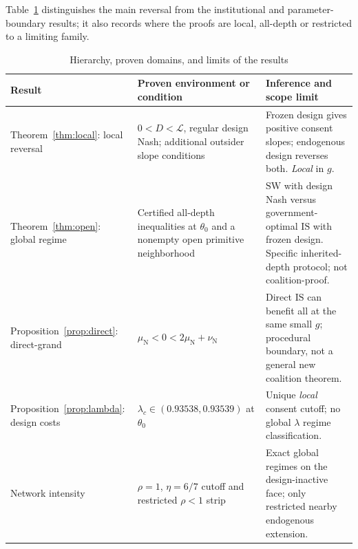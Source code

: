 \documentclass[11pt,a4paper]{article}
\theoremstyle{remark}\newtheorem{remark}[theorem]{Remark}
\newcommand{\SW}{\mathrm{SW}}\newcommand{\SU}{\mathrm{SU}}\newcommand{\IS}{\mathrm{IS}}
\newcommand{\N}{\mathrm{N}}\newcommand{\F}{\mathrm{F}}
\begin{document}
Table~\ref{tab:map} distinguishes the main reversal from the institutional and parameter-boundary results; it also records where the proofs are local, all-depth or restricted to a limiting family.


\begin{table}[H]
\centering\footnotesize
\caption{Hierarchy, proven domains, and limits of the results}\label{tab:map}
\renewcommand{\arraystretch}{1.22}
\begin{tabularx}{\linewidth}{@{}>{\raggedright\arraybackslash}p{.18\linewidth}>{\raggedright\arraybackslash}p{.34\linewidth}>{\raggedright\arraybackslash}X@{}}
\toprule
Result & Proven environment or condition & Inference and scope limit \\
\midrule
Theorem~\ref{thm:local}: local reversal & $0<D<\mathcal L$, regular design Nash; additional outsider slope conditions & Frozen design gives positive consent slopes; endogenous design reverses both. \emph{Local} in $g$. \\
Theorem~\ref{thm:open}: global regime & Certified all-depth inequalities at $\theta_0$ and a nonempty open primitive neighborhood & $\SW$ with design Nash versus government-optimal $\IS$ with frozen design. Specific inherited-depth protocol; not coalition-proof. \\
Proposition~\ref{prop:direct}: direct-grand & $\mu_{\N}<0<2\mu_{\N}+\nu_{\N}$ & Direct $\IS$ can benefit all at the same small $g$; procedural boundary, not a general new coalition theorem. \\
Proposition~\ref{prop:lambda}: design costs & $\lambda_c\in(0.93538,0.93539)$ at $\theta_0$ & Unique \emph{local} consent cutoff; no global $\lambda$ regime classification. \\
Network intensity & $\rho=1$, $\eta=6/7$ cutoff and restricted $\rho<1$ strip & Exact global regimes on the design-inactive face; only restricted nearby endogenous extension. \\
\bottomrule
\end{tabularx}
\end{table}
\end{document}
